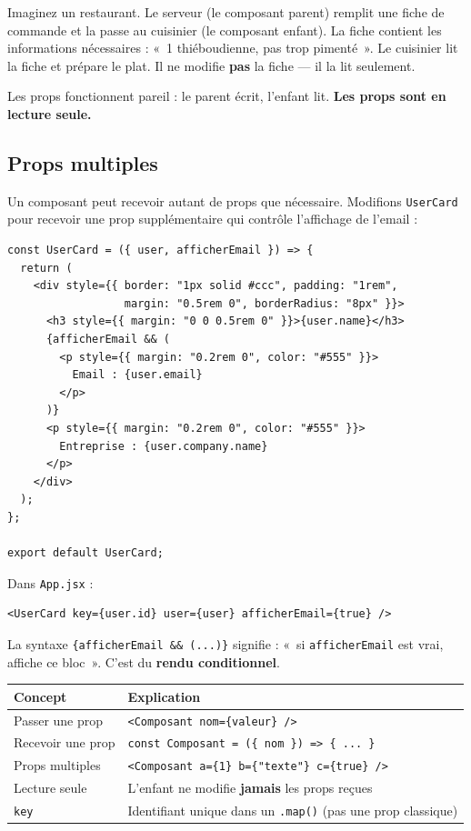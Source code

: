 \documentclass[11pt,a4paper]{article}
\begin{document}
\begin{infobox}
Imaginez un restaurant. Le serveur (le composant parent) remplit une fiche de commande et la passe au cuisinier (le composant enfant). La fiche contient les informations nécessaires : «~1 thiéboudienne, pas trop pimenté~». Le cuisinier lit la fiche et prépare le plat. Il ne modifie \textbf{pas} la fiche — il la lit seulement.

Les props fonctionnent pareil : le parent écrit, l'enfant lit. \textbf{Les props sont en lecture seule.}
\end{infobox}

\subsection{Props multiples}

Un composant peut recevoir autant de props que nécessaire. Modifions \texttt{UserCard} pour recevoir une prop supplémentaire qui contrôle l'affichage de l'email :

\begin{lstlisting}
const UserCard = ({ user, afficherEmail }) => {
  return (
    <div style={{ border: "1px solid #ccc", padding: "1rem",
                  margin: "0.5rem 0", borderRadius: "8px" }}>
      <h3 style={{ margin: "0 0 0.5rem 0" }}>{user.name}</h3>
      {afficherEmail && (
        <p style={{ margin: "0.2rem 0", color: "#555" }}>
          Email : {user.email}
        </p>
      )}
      <p style={{ margin: "0.2rem 0", color: "#555" }}>
        Entreprise : {user.company.name}
      </p>
    </div>
  );
};

export default UserCard;
\end{lstlisting}

Dans \texttt{App.jsx} :

\begin{lstlisting}
<UserCard key={user.id} user={user} afficherEmail={true} />
\end{lstlisting}

La syntaxe \texttt{\{afficherEmail \&\& (...)\}} signifie : «~si \texttt{afficherEmail} est vrai, affiche ce bloc~». C'est du \textbf{rendu conditionnel}.

\begin{retenirbox}
\begin{center}
\begin{tabular}{lp{8cm}}
\toprule
\textbf{Concept} & \textbf{Explication} \\
\midrule
Passer une prop & \texttt{<Composant nom=\{valeur\} />} \\
Recevoir une prop & \texttt{const Composant = (\{ nom \}) => \{ ... \}} \\
Props multiples & \texttt{<Composant a=\{1\} b=\{"texte"\} c=\{true\} />} \\
Lecture seule & L'enfant ne modifie \textbf{jamais} les props reçues \\
\texttt{key} & Identifiant unique dans un \texttt{.map()} (pas une prop classique) \\
\bottomrule
\end{tabular}
\end{center}
\end{retenirbox}
\end{document}
